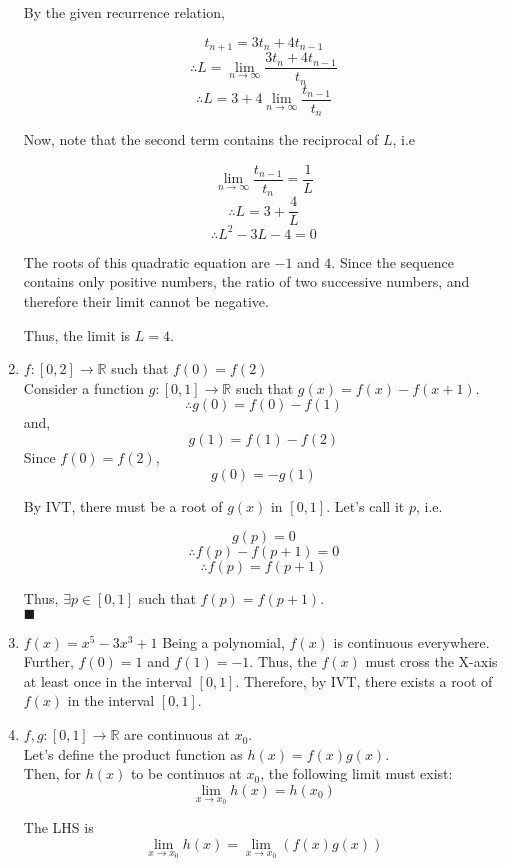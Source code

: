 \documentclass[a4paper,12pt]{article} %
\begin{document}
\begin{enumerate}
    By the given recurrence relation,

    $$ t_{n+1} = 3t_n + 4t_{n - 1} $$
    $$ \therefore L = \lim_{n \to \infty}\frac{3t_n + 4t_{n - 1}}{t_n}$$
    $$ \therefore L = 3 + 4\lim_{n \to \infty}\frac{t_{n - 1}}{t_n}$$

    Now, note that the second term contains the reciprocal of $L$, i.e

    $$ \lim_{n \to \infty}\frac{t_{n - 1}}{t_n} = \frac{1}{L}$$
    $$ \therefore L = 3 + \frac{4}{L}$$
    $$ \therefore L^2 - 3L - 4 = 0$$

    The roots of this quadratic equation are $-1$ and $4$. Since the sequence contains only positive numbers, the ratio of two successive numbers, and therefore their limit cannot be negative.

    Thus, the limit is $L = 4$.

  \item $f:[0, 2] \rightarrow \mathbb{R}$ such that $f(0) = f(2)$\\
    Consider a function $g:[0, 1] \rightarrow \mathbb{R}$ such that $g(x) = f(x) - f(x + 1)$.\\
    $$\therefore g(0) = f(0) - f(1)$$
    and,
    $$ g(1) = f(1) - f(2)$$
    Since $f(0) = f(2)$, $$g(0) = -g(1)$$

    By IVT, there must be a root of $g(x)$ in $[0, 1]$. Let's call it $p$, i.e.

    $$ g(p) = 0 $$
    $$\therefore f(p) - f(p + 1) = 0$$
    $$\therefore f(p) = f(p + 1)$$

    Thus, $\exists p \in [0, 1]$ such that $f(p) = f(p + 1)$.\\
    $\blacksquare$
  \item $f(x) = x^5 - 3x^3 + 1$
    Being a polynomial, $f(x)$ is continuous everywhere. Further, $f(0) = 1$ and $f(1) = -1$.
    Thus, the $f(x)$ must cross the X-axis at least once in the interval $[0, 1]$.
    Therefore, by IVT, there exists a root of $f(x)$ in the interval $[0, 1]$.
  \item $f, g: [0, 1] \rightarrow \mathbb{R}$ are continuous at $x_0$.\\
    Let's define the product function as $h(x) = f(x)g(x)$.\\

    Then, for $h(x)$ to be continuos at $x_0$, the following limit must exist:
    $$ \lim_{x \to x_0}h(x) = h(x_0) $$

    The LHS is
    $$ \lim_{x \to x_0}h(x) = \lim_{x \to x_0}(f(x)g(x))$$


\end{enumerate}
\end{document}
